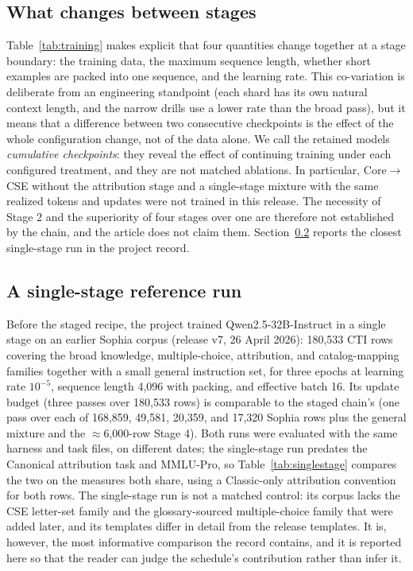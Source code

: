 \documentclass[twocolumn]{svjour3}
\begin{document}
\subsection{What changes between stages}
Table~\ref{tab:training} makes explicit that four quantities change together at a stage boundary: the training data, the maximum sequence length, whether short examples are packed into one sequence, and the learning rate. This co-variation is deliberate from an engineering standpoint (each shard has its own natural context length, and the narrow drills use a lower rate than the broad pass), but it means that a difference between two consecutive checkpoints is the effect of the whole configuration change, not of the data alone. We call the retained models \emph{cumulative checkpoints}: they reveal the effect of continuing training under each configured treatment, and they are not matched ablations. In particular, Core$\rightarrow$CSE without the attribution stage and a single-stage mixture with the same realized tokens and updates were not trained in this release. The necessity of Stage 2 and the superiority of four stages over one are therefore not established by the chain, and the article does not claim them. Section~\ref{sec:singlestage} reports the closest single-stage run in the project record.

\subsection{A single-stage reference run}\label{sec:singlestage}
Before the staged recipe, the project trained Qwen2.5-32B-Instruct in a single stage on an earlier Sophia corpus (release v7, 26 April 2026): 180,533 CTI rows covering the broad knowledge, multiple-choice, attribution, and catalog-mapping families together with a small general instruction set, for three epochs at learning rate $10^{-5}$, sequence length 4,096 with packing, and effective batch 16. Its update budget (three passes over 180,533 rows) is comparable to the staged chain's (one pass over each of 168,859, 49,581, 20,359, and 17,320 Sophia rows plus the general mixture and the $\approx$6,000-row Stage 4). Both runs were evaluated with the same harness and task files, on different dates; the single-stage run predates the Canonical attribution task and MMLU-Pro, so Table~\ref{tab:singlestage} compares the two on the measures both share, using a Classic-only attribution convention for both rows. The single-stage run is not a matched control: its corpus lacks the CSE letter-set family and the glossary-sourced multiple-choice family that were added later, and its templates differ in detail from the release templates. It is, however, the most informative comparison the record contains, and it is reported here so that the reader can judge the schedule's contribution rather than infer it.
\end{document}
